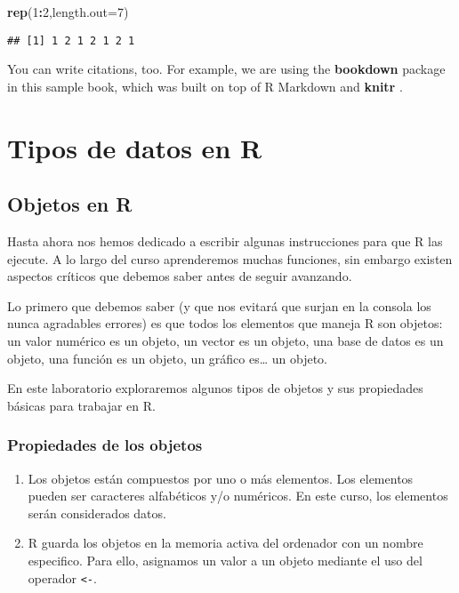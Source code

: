 \documentclass[]{book}
\newenvironment{Shaded}{\begin{snugshade}}{\end{snugshade}}
\newcommand{\DataTypeTok}[1]{\textcolor[rgb]{0.13,0.29,0.53}{#1}}
\newcommand{\DecValTok}[1]{\textcolor[rgb]{0.00,0.00,0.81}{#1}}
\newcommand{\KeywordTok}[1]{\textcolor[rgb]{0.13,0.29,0.53}{\textbf{#1}}}
\newcommand{\NormalTok}[1]{#1}
\newcommand{\OperatorTok}[1]{\textcolor[rgb]{0.81,0.36,0.00}{\textbf{#1}}}
\begin{document}
\begin{Shaded}
\begin{Highlighting}[]
\KeywordTok{rep}\NormalTok{(}\DecValTok{1}\OperatorTok{:}\DecValTok{2}\NormalTok{,}\DataTypeTok{length.out=}\DecValTok{7}\NormalTok{)}
\end{Highlighting}
\end{Shaded}

\begin{verbatim}
## [1] 1 2 1 2 1 2 1
\end{verbatim}

You can write citations, too. For example, we are using the \textbf{bookdown} package \citep{R-bookdown} in this sample book, which was built on top of R Markdown and \textbf{knitr} \citep{xie2015}.

\hypertarget{tipos-de-datos-en-r}{%
\chapter{Tipos de datos en R}\label{tipos-de-datos-en-r}}

\hypertarget{objetos-en-r}{%
\section{Objetos en R}\label{objetos-en-r}}

Hasta ahora nos hemos dedicado a escribir algunas instrucciones para que R las ejecute. A lo largo del curso
aprenderemos muchas funciones, sin embargo existen aspectos críticos que debemos saber antes de seguir avanzando.

Lo primero que debemos saber (y que nos evitará que surjan en la consola los nunca agradables errores) es que todos los elementos que maneja R son objetos: un valor numérico es un objeto, un vector es un objeto, una base de datos es un objeto, una función es un objeto, un gráfico es\ldots{} un objeto.

En este laboratorio exploraremos algunos tipos de objetos y sus propiedades básicas para trabajar en R.

\hypertarget{propiedades-de-los-objetos}{%
\subsection{Propiedades de los objetos}\label{propiedades-de-los-objetos}}

\begin{enumerate}
\def\labelenumi{\arabic{enumi}.}
\item
  Los objetos están compuestos por uno o más elementos. Los elementos pueden ser caracteres alfabéticos y/o numéricos. En este curso, los elementos serán considerados datos.
\item
  R guarda los objetos en la memoria activa del ordenador con un nombre especifico. Para ello, asignamos
  un valor a un objeto mediante el uso del operador \texttt{\textless{}-}.
\end{enumerate}
\end{document}
